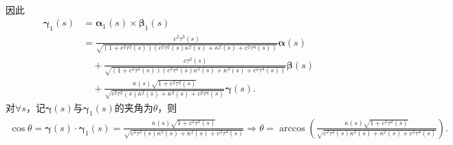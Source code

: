 \documentclass[../../main.tex]{subfiles}%
\begin{document}
\begin{solution}
\begin{align*}
\end{align*}
因此
\begin{align*}
\bm{\gamma}_1(s) &= \bm{\alpha}_1(s) \times \bm{\beta}_1(s) \\
&=\frac{c^2\tau^3(s)}{\sqrt{\left( 1+c^2\tau^2(s) \right) \left( c^2\tau^2(s)\kappa^2(s) + \kappa^2(s) + c^2\tau^4(s) \right)}}\bm{\alpha}(s) \\
&\quad+\frac{c\tau^2(s)}{\sqrt{\left( 1+c^2\tau^2(s) \right) \left( c^2\tau^2(s)\kappa^2(s) + \kappa^2(s) + c^2\tau^4(s) \right)}}\bm{\beta}(s) \\
&\quad+\frac{\kappa(s) \sqrt{1+c^2\tau^2(s)}}{\sqrt{c^2\tau^2(s)\kappa^2(s) + \kappa^2(s) + c^2\tau^4(s)}}\bm{\gamma}(s).
\end{align*}
对$\forall s$，记$\bm{\gamma}(s)$与$\bm{\gamma}_1(s)$的夹角为$\theta$，则
\begin{align*}
\cos\theta = \bm{\gamma}(s) \cdot \bm{\gamma}_1(s) = \frac{\kappa(s)\sqrt{1+c^2\tau^2(s)}}{\sqrt{c^2\tau^2(s)\kappa^2(s) + \kappa^2(s) + c^2\tau^4(s)}} \Longrightarrow \theta = \arccos\left( \frac{\kappa(s)\sqrt{1+c^2\tau^2(s)}}{\sqrt{c^2\tau^2(s)\kappa^2(s) + \kappa^2(s) + c^2\tau^4(s)}} \right).
\end{align*}

\end{solution}
\end{document}
